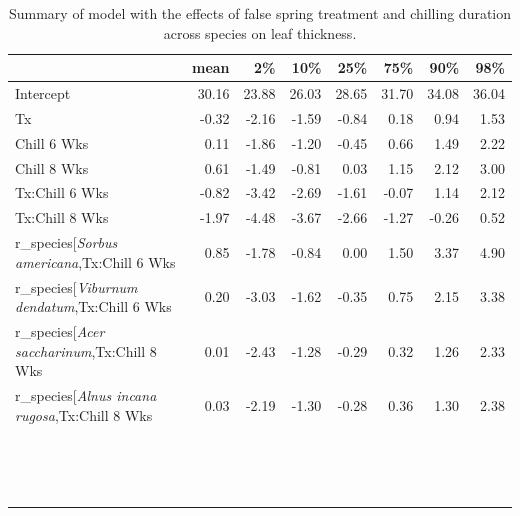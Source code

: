 \documentclass{article}\usepackage[]{graphicx}\usepackage[]{color}
\begin{document}
\begin{longtable}{lrrrrrrr}
\caption{Summary of model with the effects of false spring treatment and chilling duration across species on leaf thickness.} \\ 
  \hline
 & mean & 2\% & 10\% & 25\% & 75\% & 90\% & 98\% \\ 
  \hline \endhead  \hline
Intercept & 30.16 & 23.88 & 26.03 & 28.65 & 31.70 & 34.08 & 36.04 \\ 
  Tx & -0.32 & -2.16 & -1.59 & -0.84 & 0.18 & 0.94 & 1.53 \\ 
  Chill 6 Wks & 0.11 & -1.86 & -1.20 & -0.45 & 0.66 & 1.49 & 2.22 \\ 
  Chill 8 Wks & 0.61 & -1.49 & -0.81 & 0.03 & 1.15 & 2.12 & 3.00 \\ 
  Tx:Chill 6 Wks & -0.82 & -3.42 & -2.69 & -1.61 & -0.07 & 1.14 & 2.12 \\ 
  Tx:Chill 8 Wks & -1.97 & -4.48 & -3.67 & -2.66 & -1.27 & -0.26 & 0.52 \\ 
  r_species[\textit{Sorbus americana},Tx:Chill 6 Wks & 0.85 & -1.78 & -0.84 & 0.00 & 1.50 & 3.37 & 4.90 \\ 
  r_species[\textit{Viburnum dendatum},Tx:Chill 6 Wks & 0.20 & -3.03 & -1.62 & -0.35 & 0.75 & 2.15 & 3.38 \\ 
  r_species[\textit{Acer saccharinum},Tx:Chill 8 Wks & 0.01 & -2.43 & -1.28 & -0.29 & 0.32 & 1.26 & 2.33 \\ 
  r_species[\textit{Alnus incana rugosa},Tx:Chill 8 Wks & 0.03 & -2.19 & -1.30 & -0.28 & 0.36 & 1.30 & 2.38 \\ 
   &  &  &  &  &  &  &  \\ 
   &  &  &  &  &  &  &  \\ 
   &  &  &  &  &  &  &  \\ 
   &  &  &  &  &  &  &  \\ 
   &  &  &  &  &  &  &  \\ 
   &  &  &  &  &  &  &  \\ 
   &  &  &  &  &  &  &  \\ 
   &  &  &  &  &  &  &  \\ 
   &  &  &  &  &  &  &  \\ 
   &  &  &  &  &  &  &  \\ 
   &  &  &  &  &  &  &  \\ 
   &  &  &  &  &  &  &  \\ 
   &  &  &  &  &  &  &  \\ 
   &  &  &  &  &  &  &  \\ 
   &  &  &  &  &  &  &  \\ 

\end{longtable}
\end{document}
